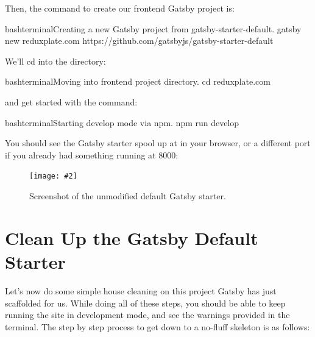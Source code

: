 \documentclass[paper=6in:9in,pagesize=pdftex,headinclude=on,footinclude=on,12pt]{scrbook}
\newcommand{\standardfigure}[3]{\begin{figure}[H]\begin{center}\texttt{[image: \#2]}\caption{#3}\label{fig:#2}\end{center}\end{figure}}
\begin{document}

Then, the command to create our frontend Gatsby project is:

\begin{codeInput}{bash}{terminal}{Creating a new Gatsby project from gatsby-starter-default.}
gatsby new reduxplate.com https://github.com/gatsbyjs/gatsby-starter-default
\end{codeInput}

We'll cd into the directory:

\begin{codeInput}{bash}{terminal}{Moving into frontend project directory.}
cd reduxplate.com
\end{codeInput}

and get started with the  command:

\begin{codeInput}{bash}{terminal}{Starting develop mode via npm.}
npm run develop
\end{codeInput}

You should see the Gatsby starter spool up at  in your browser, or a different port if you already had something running at 8000:

\standardfigure{\textwidth/2}{frontend/gatsby-starter}{Screenshot of the unmodified default Gatsby starter.}

\section{Clean Up the Gatsby Default Starter}

Let's now do some simple house cleaning on this project Gatsby has just scaffolded for us. While doing all of these steps, you should be able to keep running the site in development mode, and see the warnings provided in the terminal. The step by step process to get down to a no-fluff skeleton is as follows:
\end{document}

